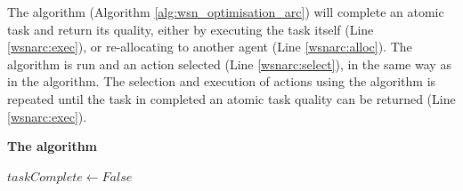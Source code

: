 The \acronymWSNOptimisationArc{}{} algorithm (Algorithm \ref{alg:wsn_optimisation_arc}) will complete an atomic task and return its quality, either by executing the task itself (Line \ref{wsnarc:exec}), or re-allocating to another agent (Line \ref{wsnarc:alloc}). The \acronymATARIA{}{} algorithm is run and an action selected (Line \ref{wsnarc:select}), in the same way as in the \acronymWSNOptimisationSink{}{} algorithm. The selection and execution of actions using the \acronymATARIA{}{} algorithm is repeated until the task in completed an atomic task quality can be returned (Line \ref{wsnarc:exec}).
\begin{algorithm}[ht]
	\DontPrintSemicolon
	\footnotesize
	
	\caption{\textbf{The \acronymWSNOptimisationArc{}{} algorithm } }
	\label{alg:wsn_optimisation_arc}
	{
		\nonl \;
		
		$taskComplete \leftarrow False$ \;
	\Return{$\functionAtomicTaskQualitySignature{}{}$\label{wsnarc:return}} \;
	}
\end{algorithm}
